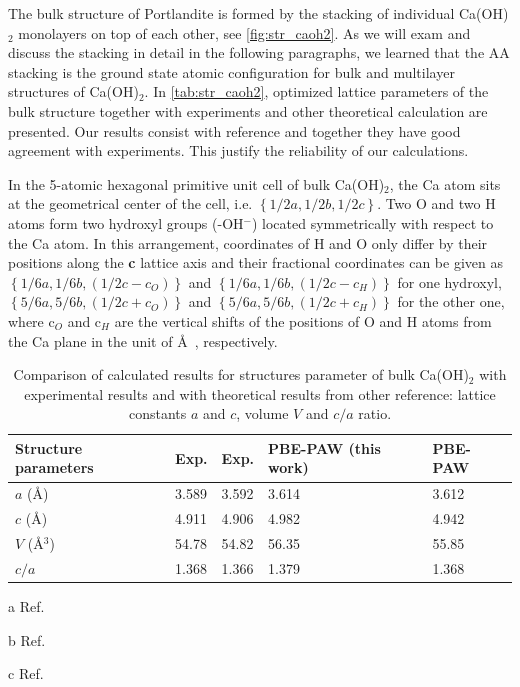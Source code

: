 The bulk structure of Portlandite is formed by the stacking of individual Ca(OH)$_2$ monolayers on top of each other, see \autoref{fig:str_caoh2}. As we will exam and discuss the stacking in detail in the following paragraphs, we learned that the AA stacking is the ground state atomic configuration for bulk and multilayer structures of Ca(OH)$_2$. In \autoref{tab:str_caoh2}, optimized lattice parameters of the bulk structure together with experiments and other theoretical calculation are presented. Our results consist with reference \cite{Pishtshev} and together they have good agreement with experiments. This justify the reliability of our calculations. 

In the 5-atomic hexagonal primitive unit cell of bulk Ca(OH)$_2$, the Ca atom sits at the geometrical
center of the cell, i.e. $\left\lbrace 1/2a, 1/2b,
1/2c \right\rbrace$. Two O and two H atoms form two hydroxyl groups 
(-OH$^-$) located symmetrically with respect to the Ca atom. In this 
arrangement, coordinates of H and O only differ by their positions along the 
\textbf{c} lattice axis and their fractional coordinates can be given as
$\left\lbrace1/6a, 1/6b, (1/2c-c_O) \right\rbrace$ and $\left\lbrace 
1/6a, 1/6b, (1/2c-c_H) \right\rbrace$ for one hydroxyl,
$\left\lbrace 5/6a, 5/6b, (1/2c+c_O) \right\rbrace$
and $\left\lbrace 5/6a, 5/6b, (1/2c+c_H)
\right\rbrace$ for the other one, where c$_O$ and c$_H$ are the vertical shifts
of the positions of O and H atoms from the Ca plane in the unit of \AA~, respectively. 

\begin{table}
\centering
\caption{\label{tab:str_caoh2}
Comparison of calculated results for structures parameter of bulk Ca(OH)$_2$ with experimental results and with theoretical results from other reference: lattice constants 
$a$ and $c$, volume $V$ and $c/a$ ratio. }
\begin{threeparttable}
\begin{tabularx}{\linewidth}{lXXXX}
\hline\hline
Structure parameters & Exp. \tnote{a} & Exp. \tnote{b} & PBE-PAW (this work) & PBE-PAW \tnote{c}  \\
\hline

$a$ (\AA)                   & 3.589 & 3.592 & 3.614 & 3.612 \\
$c$ (\AA)                   & 4.911 & 4.906 & 4.982 & 4.942 \\
$V$ (\AA$^3$)               & 54.78 & 54.82 & 56.35 & 55.85 \\
$c/a$                       & 1.368 & 1.366 & 1.379 & 1.368 \\

\hline\hline

\end{tabularx}
\begin{tablenotes}
\begin{footnotesize}
\item[a]Ref. \cite{exp.1}
\item[b]Ref. \cite{exp.2}
\item[c]Ref. \cite{Pishtshev}
\end{footnotesize}
\end{tablenotes}
\end{threeparttable}
\end{table}

